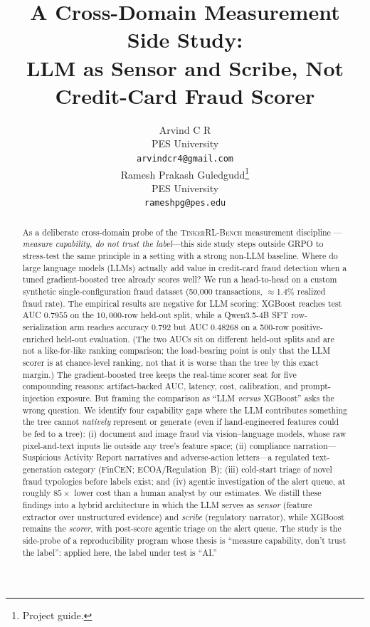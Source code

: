 \documentclass{article}
\title{A Cross-Domain Measurement Side Study:\\
       LLM as Sensor and Scribe, Not Credit-Card Fraud Scorer}
\author{
  Arvind C R \\
  PES University\\
  \texttt{arvindcr4@gmail.com} \\
  \And
  Ramesh Prakash Guledgudd\thanks{Project guide.} \\
  PES University\\
  \texttt{rameshpg@pes.edu} \\
}
\newcommand{\ours}{\textsc{TinkerRL-Bench}}
\begin{document}
\sloppy {}  \hfuzz=2pt
\maketitle
\begin{abstract}
As a deliberate cross-domain probe of the \ours{} measurement discipline
---\emph{measure capability, do not trust the label}---this side study steps
outside GRPO to stress-test the same principle in a setting with a strong
non-LLM baseline. Where do large language models (LLMs) actually add value in
credit-card fraud detection when a tuned gradient-boosted tree already scores well? We run a
head-to-head on a custom synthetic single-configuration fraud dataset (50{,}000
transactions, $\approx$1.4\% realized fraud rate). The empirical results are negative for LLM scoring:
XGBoost reaches test AUC $0.7955$ on the $10{,}000$-row held-out split, while
a Qwen3.5-4B SFT row-serialization arm reaches accuracy $0.792$ but AUC
$0.48268$ on a 500-row positive-enriched held-out evaluation. (The two AUCs sit on
different held-out splits and are not a like-for-like ranking comparison; the
load-bearing point is only that the LLM scorer is at chance-level ranking, not that
it is worse than the tree by this exact margin.) The gradient-boosted tree keeps the real-time scorer seat for five compounding reasons:
artifact-backed AUC, latency, cost, calibration, and prompt-injection exposure.
But framing the comparison as
``LLM \emph{versus} XGBoost'' asks the wrong question. We identify four
capability gaps where the LLM contributes something the tree cannot \emph{natively}
represent or generate (even if hand-engineered features could be fed to a tree):
(i) document and image fraud via vision--language models, whose
raw pixel-and-text inputs lie outside any tree's feature space; (ii) compliance
narration---Suspicious Activity Report narratives and adverse-action
letters---a regulated text-generation category (FinCEN; ECOA/Regulation~B);
(iii) cold-start triage of novel fraud typologies before labels exist; and
(iv) agentic investigation of the alert queue, at roughly $85\times$ lower cost
than a human analyst by our estimates. We distill these findings into a
hybrid architecture in which the LLM serves as \emph{sensor} (feature extractor
over unstructured evidence) and \emph{scribe} (regulatory narrator), while
XGBoost remains the \emph{scorer}, with post-score agentic triage on the alert
queue. The study is the side-probe of a reproducibility program whose thesis is
``measure capability, don't trust the label'': applied here, the label under
test is ``AI.''
\end{abstract}
 
\end{document}
